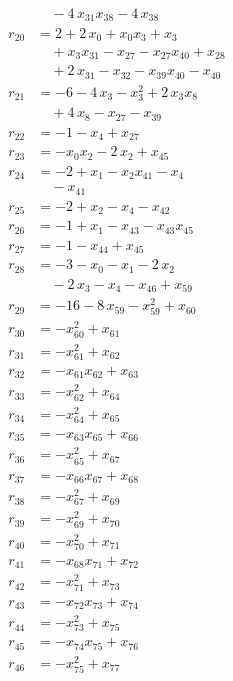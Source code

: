 \begin{align*}
&\quad{}- 4\,x_{31} x_{38} - 4\,x_{38} \\
r_{20} &= 2 + 2\,x_{0} + x_{0} x_{3} + x_{3} \\
&\quad{}+ x_{3} x_{31} - x_{27} - x_{27} x_{40} + x_{28} \\
&\quad{}+ 2\,x_{31} - x_{32} - x_{39} x_{40} - x_{40} \\
r_{21} &= -6 - 4\,x_{3} - x_{3}^{2} + 2\,x_{3} x_{8} \\
&\quad{}+ 4\,x_{8} - x_{27} - x_{39} \\
r_{22} &= -1 - x_{4} + x_{27} \\
r_{23} &= -x_{0} x_{2} - 2\,x_{2} + x_{45} \\
r_{24} &= -2 + x_{1} - x_{2} x_{41} - x_{4} \\
&\quad{}- x_{41} \\
r_{25} &= -2 + x_{2} - x_{4} - x_{42} \\
r_{26} &= -1 + x_{1} - x_{43} - x_{43} x_{45} \\
r_{27} &= -1 - x_{44} + x_{45} \\
r_{28} &= -3 - x_{0} - x_{1} - 2\,x_{2} \\
&\quad{}- 2\,x_{3} - x_{4} - x_{46} + x_{59} \\
r_{29} &= -16 - 8\,x_{59} - x_{59}^{2} + x_{60} \\
r_{30} &= -x_{60}^{2} + x_{61} \\
r_{31} &= -x_{61}^{2} + x_{62} \\
r_{32} &= -x_{61} x_{62} + x_{63} \\
r_{33} &= -x_{62}^{2} + x_{64} \\
r_{34} &= -x_{64}^{2} + x_{65} \\
r_{35} &= -x_{63} x_{65} + x_{66} \\
r_{36} &= -x_{65}^{2} + x_{67} \\
r_{37} &= -x_{66} x_{67} + x_{68} \\
r_{38} &= -x_{67}^{2} + x_{69} \\
r_{39} &= -x_{69}^{2} + x_{70} \\
r_{40} &= -x_{70}^{2} + x_{71} \\
r_{41} &= -x_{68} x_{71} + x_{72} \\
r_{42} &= -x_{71}^{2} + x_{73} \\
r_{43} &= -x_{72} x_{73} + x_{74} \\
r_{44} &= -x_{73}^{2} + x_{75} \\
r_{45} &= -x_{74} x_{75} + x_{76} \\
r_{46} &= -x_{75}^{2} + x_{77} \\

\end{align*}
